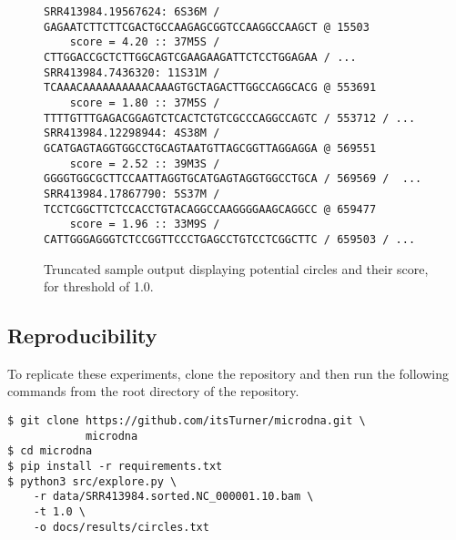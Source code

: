 \documentclass[11pt, letterpaper]{article}
\begin{document}

\begin{figure}[h!] \centering
    \begin{verbatim}
SRR413984.19567624: 6S36M / GAGAATCTTCTTCGACTGCCAAGAGCGGTCCAAGGCCAAGCT @ 15503
	score = 4.20 :: 37M5S / CTTGGACCGCTCTTGGCAGTCGAAGAAGATTCTCCTGGAGAA / ...
SRR413984.7436320: 11S31M / TCAAACAAAAAAAAAACAAAGTGCTAGACTTGGCCAGGCACG @ 553691
	score = 1.80 :: 37M5S / TTTTGTTTGAGACGGAGTCTCACTCTGTCGCCCAGGCCAGTC / 553712 / ...
SRR413984.12298944: 4S38M / GCATGAGTAGGTGGCCTGCAGTAATGTTAGCGGTTAGGAGGA @ 569551
	score = 2.52 :: 39M3S / GGGGTGGCGCTTCCAATTAGGTGCATGAGTAGGTGGCCTGCA / 569569 /  ...
SRR413984.17867790: 5S37M / TCCTCGGCTTCTCCACCTGTACAGGCCAAGGGGAAGCAGGCC @ 659477
	score = 1.96 :: 33M9S / CATTGGGAGGGTCTCCGGTTCCCTGAGCCTGTCCTCGGCTTC / 659503 / ...
    \end{verbatim}
    \caption{Truncated sample output displaying potential circles and their score, for threshold of 1.0.}
    \label{fig:sample}
\end{figure}

\subsection{Reproducibility}
To replicate these experiments, clone the repository and then run the
following commands from the root directory of the repository.
\begin{verbatim}
$ git clone https://github.com/itsTurner/microdna.git \
            microdna
$ cd microdna
$ pip install -r requirements.txt
$ python3 src/explore.py \
    -r data/SRR413984.sorted.NC_000001.10.bam \
    -t 1.0 \
    -o docs/results/circles.txt
\end{verbatim}
\end{document}

